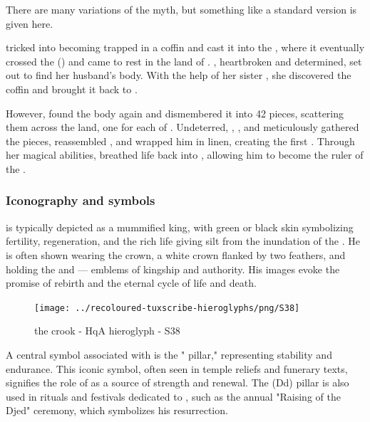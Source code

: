 There are many variations of the myth, but something like a standard version is given here.

 tricked  into becoming trapped in a coffin and cast it into the , where it eventually crossed the  () and came to rest in the land of . , heartbroken and determined, set out to find her husband's body. With the help of her sister , she discovered the coffin and brought it back to .

However,  found the body again and dismembered it into 42 pieces, scattering them across the land, one for each  of . Undeterred, , , and  meticulously gathered the pieces, reassembled , and wrapped him in linen, creating the first . Through her magical abilities,  breathed life back into , allowing him to become the ruler of the .

\subsubsection*{Iconography and symbols}

 is typically depicted as a mummified king, with green or black skin symbolizing fertility, regeneration, and the rich life giving silt from the inundation of the . He is often shown wearing the  crown, a white crown flanked by two  feathers, and holding the  and  — emblems of kingship and authority. His images evoke the promise of rebirth and the eternal cycle of life and death.

\begin{figure} [H]
	\centering
	\texttt{[image: ../recoloured-tuxscribe-hieroglyphs/png/S38]}
	\caption{the crook - HqA hieroglyph - S38}
\end{figure}

A central symbol associated with  is the " pillar," representing stability and endurance. This iconic symbol, often seen in temple reliefs and funerary texts, signifies the role of  as a source of strength and renewal. The  (Dd) pillar is also used in rituals and festivals dedicated to , such as the annual "Raising of the Djed" ceremony, which symbolizes his resurrection.

